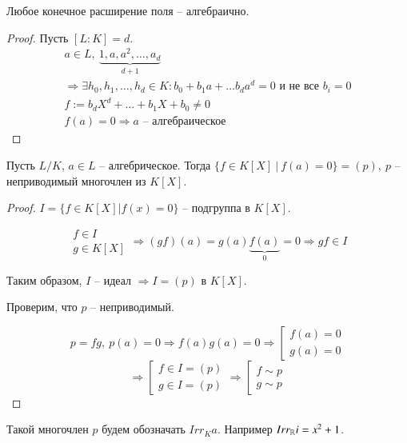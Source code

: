 \documentclass[main]{subfiles}
\begin{document}
\begin{proposition}
    Любое конечное расширение поля -- алгебраично.
\end{proposition}

\begin{proof}
    Пусть $[L:K] = d$.
    \begin{gather*}
        a \in L, \ \underbrace{1, a, a^2, \ldots, a_d}_{d+1} \\
        \Rightarrow \exists h_0, h_1, \ldots, h_d \in K : b_0 + b_1a + \ldots b_da^d = 0 \text{ и не все } b_i = 0\\
        f:= b_dX^d + \ldots + b_1 X + b_0 \ne 0 \\
        f(a) = 0 \Rightarrow a \text{ -- алгебраическое }
    \end{gather*}
\end{proof}

\begin{proposition}
    Пусть $L / K$, $a \in L$ -- алгебрическое. Тогда $ \{ f \in K[X] \ | \  f(a) = 0 \} = (p), \ 
    p$ -- неприводимый многочлен из $K[X]$.
\end{proposition}

\begin{proof}
    $ I = \{ f \in K[X] | f(x) = 0 \} \text{ -- подгруппа в } K[X]$.

    \[\left.
    \begin{gathered}
        f \in I \\
        g \in K[X]
    \end{gathered} \right. \Rightarrow (gf)(a) = g(a)\underbrace{f(a)}_{0} = 0 \Rightarrow gf \in I \]

    Таким образом, $I$ -- идеал $\Rightarrow I = (p)$ в $K[X]$. 

    Проверим, что $p$ -- неприводимый.
  
    \[p = fg, \ 
    p(a) = 0 \Rightarrow f(a)g(a) = 0 \Rightarrow \left[ \begin{gathered}
        f(a) = 0 \\
        g(a) = 0
    \end{gathered} \right. \]
    \[ \Rightarrow \left[ \begin{gathered}
        f \in I = (p) \\
        g \in I = (p)
    \end{gathered} \right. \Rightarrow \left[ \begin{gathered}
        f \sim p \\
        g \sim p
    \end{gathered} \right. \]
\end{proof}
Такой многочлен $p$ будем обозначать $Irr_K a$. Например $Irr_{\mathbb{R}} i = x^2 + 1$. \\
\end{document}
